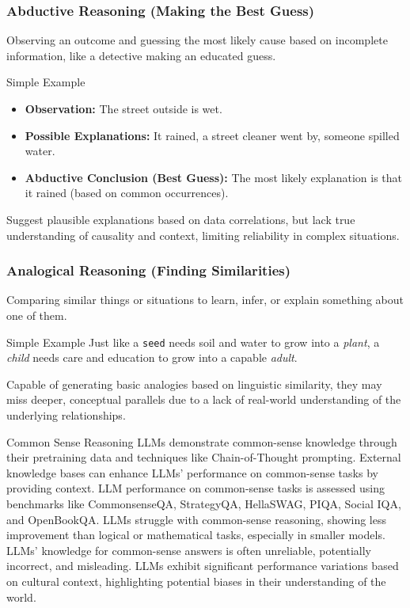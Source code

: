 \begin{frame}
\frametitle{Abductive Reasoning (Making the Best Guess)}

Observing an outcome and guessing the most likely cause based on incomplete information, like a detective making an educated guess.

\bigskip

\begin{block}{Simple Example}
  \begin{itemize}
    \item \textbf{Observation:} The street outside is wet.
    \item \textbf{Possible Explanations:} It rained, a street cleaner went by, someone spilled water.
    \item \textbf{Abductive Conclusion (Best Guess):} The most likely explanation is that it rained (based on common occurrences).
  \end{itemize}
\end{block}

\bigskip

 Suggest plausible explanations based on data correlations, but lack true understanding of causality and context, limiting reliability in complex situations.
\end{frame}

\begin{frame}
\frametitle{Analogical Reasoning (Finding Similarities)}

Comparing similar things or situations to learn, infer, or explain something about one of them.

\bigskip

\begin{block}{Simple Example}
  Just like a \texttt{seed} needs soil and water to grow into a \textit{plant}, a \textit{child} needs care and education to grow into a capable \textit{adult}.
\end{block}

\bigskip

Capable of generating basic analogies based on linguistic similarity, they may miss deeper, conceptual parallels due to a lack of real-world understanding of the underlying relationships.
\end{frame}


\begin{frame}{Common Sense  Reasoning}
	LLMs demonstrate common-sense knowledge through their pretraining data and techniques like Chain-of-Thought prompting.
	External knowledge bases can enhance LLMs’ performance on common-sense tasks by providing context.
	LLM performance on common-sense tasks is assessed using benchmarks like CommonsenseQA, StrategyQA, HellaSWAG, PIQA, Social IQA, and OpenBookQA.
	LLMs struggle with common-sense reasoning, showing less improvement than logical or mathematical tasks, especially in smaller models.
	LLMs’ knowledge for common-sense answers is often unreliable, potentially incorrect, and misleading.
	LLMs exhibit significant performance variations based on cultural context, highlighting potential biases in their understanding of the world.

\end{frame}


